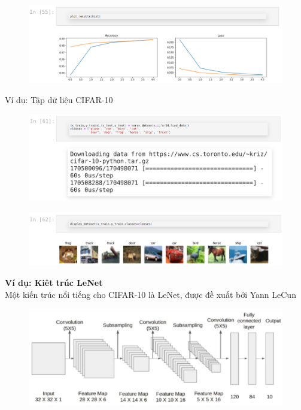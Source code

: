 \documentclass{book}
\begin{document}
\begin{figure}[H]
    \centering
    \includegraphics[width=1.0\linewidth]{images/code11.png}
    \label{fig:code11}
\end{figure}
Ví dụ: Tập dữ liệu CIFAR-10 
\begin{figure}[H]
    \centering
    \includegraphics[width=1.0\linewidth]{images/code12.png}
    \label{fig:code12}
\end{figure}
\begin{figure}[H]
    \centering
    \includegraphics[width=1.0\linewidth]{images/code13.png}
    \label{fig:code13}
\end{figure}
\textbf{Ví dụ: Kiêt trúc LeNet}\\
Một kiến trúc nổi tiếng cho CIFAR-10 là LeNet, được đề xuất bởi Yann LeCun
\begin{figure}[H]
    \centering
    \includegraphics[width=1.0\linewidth]{images/lenet.png}
    \label{fig:lenet}
\end{figure}
\end{document}
